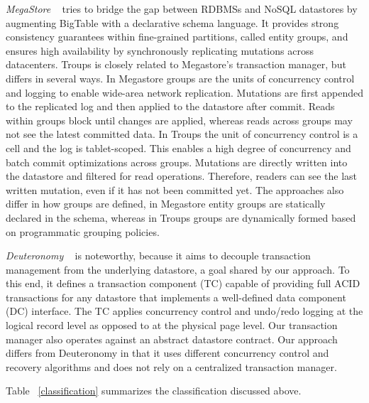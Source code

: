 \documentclass[10pt,final,journal]{IEEEtran}
\begin{document}
\emph{MegaStore} ~\cite{Furman:2008:8530095, Baker:2011:8530095} tries to bridge the gap between RDBMSs and NoSQL datastores by augmenting BigTable with a declarative schema language. It provides strong consistency guarantees within fine-grained partitions, called entity groups, and ensures high availability by synchronously replicating mutations across datacenters. Troups is closely related to Megastore's transaction manager, but differs in several ways. In Megastore groups are the units of concurrency control and logging to enable wide-area network replication. Mutations are first appended to the replicated log and then applied to the datastore after commit. Reads within groups block until changes are applied, whereas reads across groups may not see the latest committed data. In Troups the unit of concurrency control is a cell and the log is tablet-scoped. This enables a high degree of concurrency and batch commit optimizations across groups. Mutations are directly written into the datastore and filtered for read operations. Therefore, readers can see the last written mutation, even if it has not been committed yet. The approaches also differ in how groups are defined, in Megastore entity groups are statically declared in the schema, whereas in Troups groups are dynamically formed based on programmatic grouping policies.

\emph{Deuteronomy} ~\cite{Levandoski:2011:8530161} is noteworthy, because it aims to decouple transaction management from the underlying datastore, a goal shared by our approach. To this end, it defines a transaction component (TC) capable of providing full ACID transactions for any datastore that implements a well-defined data component (DC) interface. The TC applies concurrency control and undo/redo logging at the logical record level as opposed to at the physical page level. Our transaction manager also operates against an abstract datastore contract. Our approach differs from Deuteronomy in that it uses different concurrency control and recovery algorithms and does not rely on a centralized transaction manager.

Table ~\ref{classification} summarizes the classification discussed above.
\end{document}
